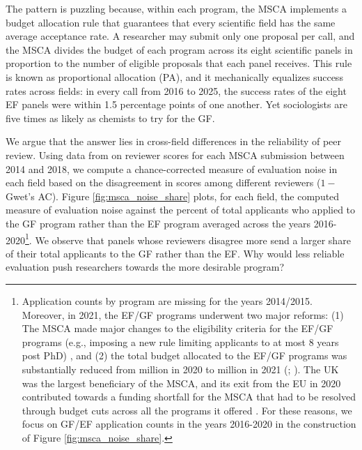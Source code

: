 \documentclass[12pt,reqno]{amsart}
\theoremstyle{definition}
\theoremstyle{plain} %
\begin{document}
\noindent The pattern is puzzling because, within each program, the MSCA implements a budget allocation rule that guarantees that every scientific field has the same average acceptance rate. A researcher may submit only one proposal per call, and the MSCA divides the budget of each program across its eight scientific panels in proportion to the number of eligible proposals that each panel receives. This rule is known as proportional allocation (PA), and it mechanically equalizes success rates across fields: in every call from 2016 to 2025, the success rates of the eight EF panels were within 1.5 percentage points of one another. Yet sociologists are five times as likely as chemists to try for the GF.

\noindent We argue that the answer lies in cross-field differences in the reliability of peer review. Using data from \cite{pina2021retrospective} on reviewer scores for each MSCA submission between 2014 and 2018, we compute a chance-corrected measure of evaluation noise in each field based on the disagreement in scores among different reviewers ($1-{}$Gwet's AC). Figure \ref{fig:msca_noise_share} plots, for each field, the computed measure of evaluation noise against the percent of total applicants who applied to the GF program rather than the EF program averaged across the years 2016-2020\footnote{Application counts by program are missing for the years 2014/2015. Moreover, in 2021, the EF/GF programs underwent two major reforms: (1) The MSCA made major changes to the eligibility criteria for the EF/GF programs (e.g., imposing a new rule limiting applicants to at most 8 years post PhD) \citep[p.~86]{ec2021mscawp}, and (2) the total budget allocated to the EF/GF programs was substantially reduced from  million in 2020 to  million in 2021 (\citealp[p.~5]{ec2020ifguide}; \citealp[p.~21]{ec2021mscawp}). The UK was the largest beneficiary of the MSCA, and its exit from the EU in 2020 contributed towards a funding shortfall for the MSCA that had to be resolved through budget cuts across all the programs it offered \citep{rpn2021msca}. For these reasons, we focus on GF/EF application counts in the years 2016-2020 in the construction of Figure \ref{fig:msca_noise_share}.}. We observe that panels whose reviewers disagree more send a larger share of their total applicants to the GF rather than the EF. Why would less reliable evaluation push researchers towards the more desirable program?
\end{document}
